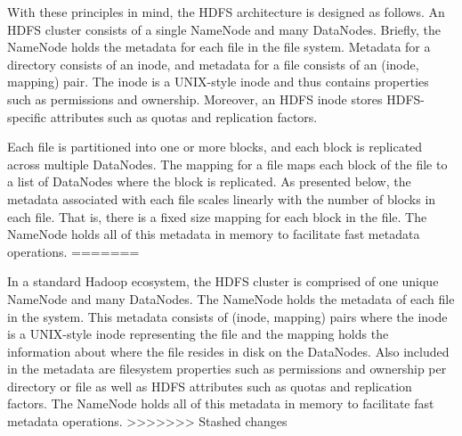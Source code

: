 \documentclass[11pt, a4paper]{article}
\begin{document}
\begin{multicols*}{2}

With these principles in mind, the HDFS architecture is designed as follows. An HDFS cluster consists of a single NameNode and many DataNodes. Briefly, the NameNode holds the metadata for each file in the file system. Metadata for a directory consists of an inode, and metadata for a file consists of an (inode, mapping) pair. The inode is a UNIX-style inode and thus contains properties such as permissions and ownership. Moreover, an HDFS inode stores HDFS-specific attributes such as quotas and replication factors.

Each file is partitioned into one or more blocks, and each block is replicated across multiple DataNodes. The mapping for a file maps each block of the file to a list of DataNodes where the block is replicated. As presented below, the metadata associated with each file scales linearly with the number of blocks in each file. That is, there is a fixed size mapping for each block in the file. The NameNode holds all of this metadata in memory to facilitate fast metadata operations.
=======

In a standard Hadoop ecosystem, the HDFS cluster is comprised of one unique NameNode and many DataNodes. The NameNode holds the metadata of each file in the system. This metadata consists of (inode, mapping) pairs where the inode is a UNIX-style inode representing the file and the mapping holds the information about where the file resides in disk on the DataNodes. Also included in the metadata are filesystem properties such as permissions and ownership per directory or file as well as HDFS attributes such as quotas and replication factors. The NameNode holds all of this metadata in memory to facilitate fast metadata operations. 
>>>>>>> Stashed changes


\end{multicols*}
\end{document}
